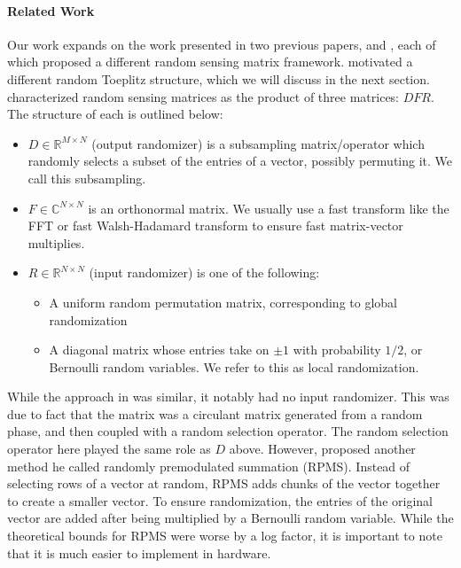 \paragraph{Related Work}
Our work expands on the work presented in two previous papers, \cite{doetal} and \cite{romberg2009}, each of which proposed a different random sensing matrix framework. \cite{wotao} motivated a different random Toeplitz structure, which we will discuss in the next section. \cite{doetal} characterized random sensing matrices as the product of three matrices: $DFR$. The structure of each is outlined below:

\begin{itemize}
	\item $D\in \mathbb{R}^{M\times N}$ (output randomizer) is a subsampling matrix/operator which randomly selects a subset of the entries of a vector, possibly permuting it. We call this subsampling.
	\item $F\in\mathbb{C}^{N\times N}$ is an orthonormal matrix. We usually use a fast transform like the FFT or fast Walsh-Hadamard transform to ensure fast matrix-vector multiplies.
	\item $R\in\mathbb{R}^{N\times N}$ (input randomizer) is one of the following:
		\begin{itemize}
			\item A uniform random permutation matrix, corresponding to global randomization
			\item A diagonal matrix whose entries take on $\pm 1$ with probability $1/2$, or Bernoulli random variables. We refer to this as local randomization.
		\end{itemize}
\end{itemize}

While the approach in \cite{romberg2009} was similar, it notably had no input randomizer. This was due to fact that the matrix was a circulant matrix generated from a random phase, and then coupled with a random selection operator. The random selection operator here played the same role as $D$ above. However, \cite{romberg2009} proposed another method he called randomly premodulated summation (RPMS). Instead of selecting rows of a vector at random, RPMS adds chunks of the vector together to create a smaller vector. To ensure randomization, the entries of the original vector are added after being multiplied by a Bernoulli random variable. While the theoretical bounds for RPMS were worse by a log factor, it is important to note that it is much easier to implement in hardware.

